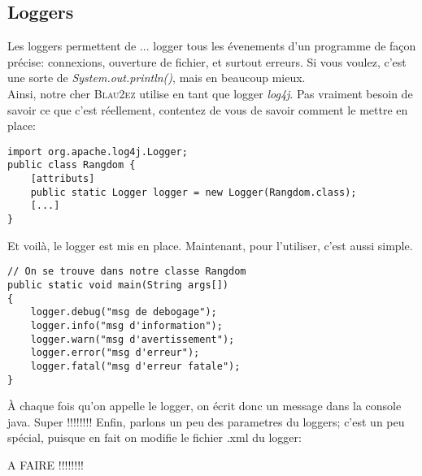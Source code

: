 \documentclass{article}
\begin{document}
\subsection{Loggers}
Les loggers permettent de ... logger tous les évenements d'un programme de façon précise: connexions, ouverture de fichier, et surtout erreurs. Si vous voulez, c'est une sorte de \emph{System.out.println()}, mais en beaucoup mieux.\\
Ainsi, notre cher \textsc{Blau2ez} utilise en tant que logger \emph{log4j}. Pas vraiment besoin de savoir ce que c'est réellement, contentez de vous de savoir comment le mettre en place:
\begin{lstlisting}
import org.apache.log4j.Logger;
public class Rangdom {
	[attributs]
	public static Logger logger = new Logger(Rangdom.class);
	[...]
}
\end{lstlisting}
Et voilà, le logger est mis en place. Maintenant, pour l'utiliser, c'est aussi simple.
\begin{lstlisting}
// On se trouve dans notre classe Rangdom
public static void main(String args[])
{
	logger.debug("msg de debogage");
	logger.info("msg d'information");
	logger.warn("msg d'avertissement");
	logger.error("msg d'erreur");
	logger.fatal("msg d'erreur fatale");   
}
\end{lstlisting}
À chaque fois qu'on appelle le logger, on écrit donc un message dans la console java. Super !!!!!!!!	
Enfin, parlons un peu des parametres du loggers; c'est un peu spécial, puisque en fait on modifie le fichier .xml du logger:

A FAIRE !!!!!!!!
\end{document}
